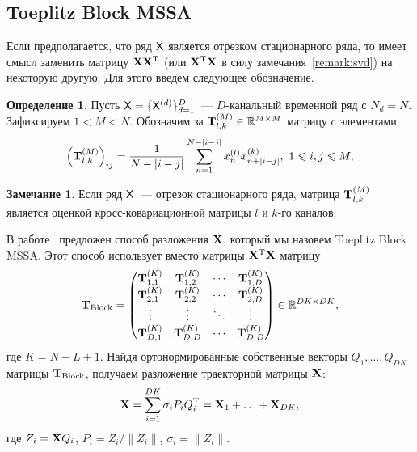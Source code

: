 \documentclass[specialist,
substylefile = spbu_report.rtx,
subf,href,colorlinks=true, 12pt]{disser}
\theoremstyle{definition}
\newtheorem{definition}{Определение}
\newtheorem{remark}{Замечание}
\newcommand{\R}{\mathbb{R}}
\begin{document}
\subsection{Toeplitz Block MSSA}\label{sect:block}
Если предполагается, что ряд $\mathsf{X}$ является отрезком стационарного ряда, то имеет смысл заменить матрицу $\mathbf{X}\mathbf{X}^{\mathrm{T}}$ (или $\mathbf{X}^{\mathrm{T}}\mathbf{X}$ в силу замечания~\ref{remark:svd}) на некоторую другую. Для этого введем следующее обозначение.
\begin{definition}
	Пусть $\mathsf{X}=\{\mathsf{X}^{(d)}\}_{d=1}^D$~--- $D$-канальный временной ряд с $N_d=N$. Зафиксируем $1<M<N$. Обозначим за $\bfT_{l,k}^{(M)}\in \R^{M\times M}$ матрицу c элементами
	\begin{equation*}\label{eq:block_elements}
		\left(\mathbf{T}^{(M)}_{l,k}\right)_{ij}=\frac{1}{N-|i-j|}\sum_{n=1}^{N-|i-j|} x^{(l)}_nx^{(k)}_{n+|i-j|},\ 1\leqslant i,j\leqslant M,
	\end{equation*}
\end{definition}
\begin{remark}
	Если ряд $\mathsf{X}$~--- отрезок стационарного ряда, матрица $\mathbf{T}_{l,k}^{(M)}$ является оценкой кросс-ковариационной матрицы $l$ и $k$-го каналов.
\end{remark}
В работе~\cite{Plaut1994SpellsOL} предложен способ разложения $\mathbf{X}$, который мы назовем Toeplitz Block MSSA. Этот способ использует вместо матрицы $\mathbf{X}^{\mathrm{T}}\mathbf{X}$ матрицу $$\bfT_{\text{Block}}=\begin{pmatrix}
	\bfT^{(K)}_{1,1} & \bfT^{(K)}_{1,2} & \cdots & \bfT^{(K)}_{1,D} \\
	\bfT^{(K)}_{2,1} & \bfT^{(K)}_{2,2} & \cdots & \bfT^{(K)}_{2,D} \\
	\vdots           & \vdots           & \ddots & \vdots           \\
	\bfT^{(K)}_{D,1} & \bfT^{(K)}_{D,D} & \cdots & \bfT^{(K)}_{D,D}
\end{pmatrix} \in \R^{DK\times DK},$$ где $K = N - L + 1$. Найдя ортонормированные собственные векторы $Q_1,\ldots,Q_{DK}$ матрицы $\mathbf{T}_\text{Block}$, получаем разложение траекторной матрицы $\mathbf{X}$:
\begin{equation}\label{eq:block_decomposition}
	\mathbf{X}=\sum_{i=1}^{DK} \sigma_i P_i Q_i^{\mathrm{T}}=\mathbf{X}_1+\ldots+\mathbf{X}_{DK},
\end{equation}
где $Z_i=\mathbf{X} Q_i$, $P_i=Z_i/\|Z_i\|$, $\sigma_i=\|Z_i\|$.
\end{document}
